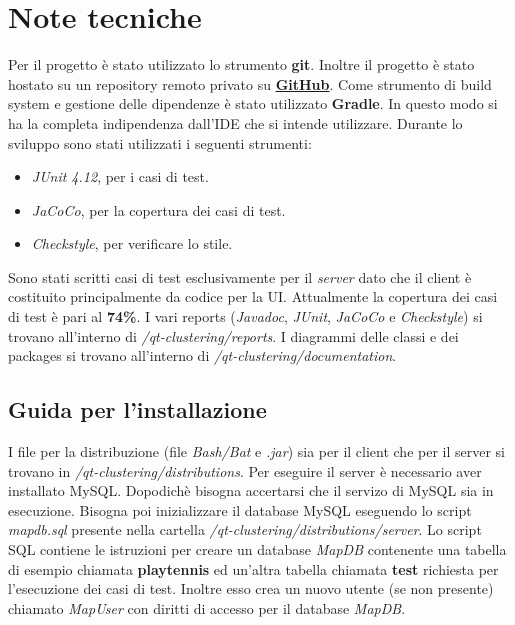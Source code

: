 \documentclass{article}
\begin{document}
	\section{Note tecniche}
	Per il progetto è stato utilizzato lo strumento \textbf{git}. Inoltre
	il progetto è stato hostato su un repository remoto privato su
	\href{https://github.com}{\textbf{GitHub}}. Come strumento di build
	system e gestione delle dipendenze è stato utilizzato \textbf{Gradle}.
	In questo modo si ha la completa indipendenza dall'IDE che si intende
	utilizzare. 
	Durante lo sviluppo sono stati utilizzati i seguenti strumenti:
	\begin{itemize}
		\item \textit{JUnit 4.12}, per i casi di test.
		\item \textit{JaCoCo}, per la copertura dei casi di test.
		\item \textit{Checkstyle}, per verificare lo stile.
	\end{itemize}
	Sono stati scritti casi di test esclusivamente per il \textit{server}
	dato che il client è costituito principalmente da codice per la UI.	
	Attualmente la copertura dei casi di test è pari al \textbf{74\%}.
	I vari reports (\textit{Javadoc}, \textit{JUnit}, \textit{JaCoCo} e
	\textit{Checkstyle}) si trovano all'interno di
	\textit{/qt-clustering/reports}.
	I diagrammi delle classi e dei packages si trovano all'interno di
	\textit{/qt-clustering/documentation}.

	\subsection {Guida per l'installazione}
	I file per la distribuzione (file \textit{Bash/Bat} e
	\textit{.jar}) sia per il client che per il server si trovano in
	\textit{/qt-clustering/distributions}.
	Per eseguire il server è necessario aver installato MySQL.
	Dopodichè bisogna accertarsi che il servizo di MySQL sia in
	esecuzione. Bisogna poi inizializzare il database MySQL eseguendo lo
	script \textit{mapdb.sql} presente nella cartella
	\textit{/qt-clustering/distributions/server}.
	Lo script SQL contiene le istruzioni per creare un database \textit{MapDB}
	contenente una tabella di esempio chiamata \textbf{playtennis}
	ed un'altra tabella chiamata \textbf{test} richiesta per
	l'esecuzione dei casi di test. Inoltre esso crea un nuovo utente
	(se non presente) chiamato \textit{MapUser} con diritti di accesso
	per il database \textit{MapDB}.
\end{document}
